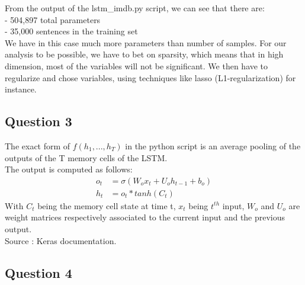 \documentclass[11pt, oneside]{article}   	%
\begin{document}
From the output of the lstm\_imdb.py script, we can see that there are:\\
\indent - 504,897 total parameters\\
\indent - 35,000 sentences in the training set\\
We have in this case much more parameters than number of samples. For our analysis to be possible, we have to bet on sparsity, which means that in high dimension, most of the variables will not be significant. We then have to regularize and chose variables, using techniques like lasso (L1-regularization) for instance.

\subsection{Question 3}

The exact form of $f(h_{1}, . . . ,h_{T})$ in the python script is an average pooling of the outputs of the T memory cells of the LSTM.\\
The output is computed as follows:
	\[\begin{split}
		o_{t} &= \sigma(W_{o}x_{t} + U_{o}h_{t-1} + b_{o})\\
		h_{t} &= o_{t} * tanh(C_{t})
	\end{split}\]
With $C_{t}$ being the memory cell state at time t, $x_{t}$ being $t^{th}$ input, $W_{o}$ and $U_{o}$ are weight matrices respectively associated to the current input and the previous output.\\
Source : Keras documentation.

\subsection{Question 4}
\end{document}
